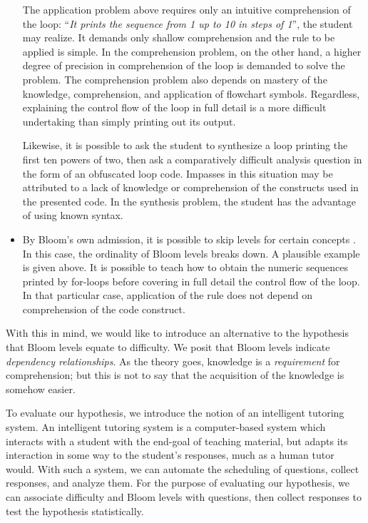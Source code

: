 \documentclass[a4paper,twocolumn]{article}
\begin{document}
\begin{itemize}
The application problem above requires only an intuitive comprehension of the
loop: ``\emph{It prints the sequence from 1 up to 10 in steps of 1}'', the
student may realize.  It demands only shallow comprehension and the rule to be
applied is simple.  In the comprehension problem, on the other hand, a higher
degree of precision in comprehension of the loop is demanded to solve the
problem.  The comprehension problem also depends on mastery of the knowledge,
comprehension, and application of flowchart symbols.  Regardless, explaining
the control flow of the loop in full detail is a more difficult undertaking
than simply printing out its output. 

Likewise, it is possible to ask the student to synthesize a loop printing the
first ten powers of two, then ask a comparatively difficult analysis question
in the form of an obfuscated loop code.  Impasses in this situation may be
attributed to a lack of knowledge or comprehension of the constructs used in
the presented code.  In the synthesis problem, the student has the advantage
of using known syntax. 

\item By Bloom's own admission, it is possible to skip levels for certain
concepts \cite{bloom1956}.  In this case, the ordinality of Bloom levels breaks
down.  A plausible example is given above.  It is possible to teach how to
obtain the numeric sequences printed by for-loops before covering in full
detail the control flow of the loop.  In that particular case, application of
the rule does not depend on comprehension of the code construct.

\end{itemize}

With this in mind, we would like to introduce an alternative to the hypothesis
that Bloom levels equate to difficulty.  We posit that Bloom levels indicate
\emph{dependency relationships}.  As the theory goes, knowledge is a
\emph{requirement} for comprehension; but this is not to say that the
acquisition of the knowledge is somehow easier.  

To evaluate our hypothesis, we introduce the notion of an intelligent tutoring
system.  An intelligent tutoring system is a computer-based system which
interacts with a student with the end-goal of teaching material, but adapts its
interaction in some way to the student's responses, much as a human tutor
would.  With such a system, we can automate the scheduling of questions,
collect responses, and analyze them. For the purpose of evaluating our
hypothesis, we can associate difficulty and Bloom levels with questions, then
collect responses to test the hypothesis statistically.
\end{document}
